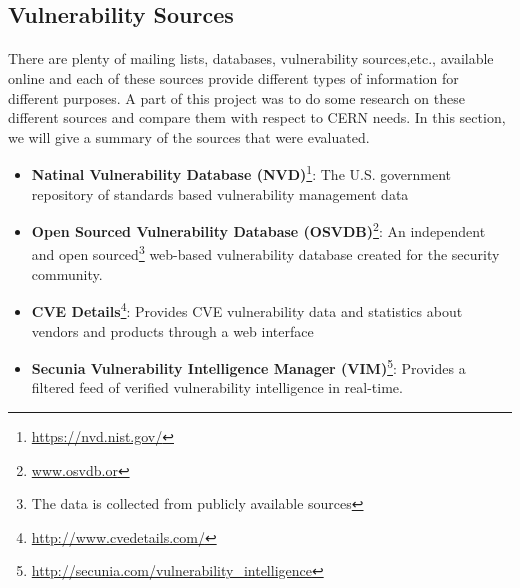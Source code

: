 \subsection{Vulnerability Sources}

\paragraph{}
There are plenty of mailing lists, databases, vulnerability sources,etc., available online and each of these sources provide different types of information for different purposes. A part of this project was to do some research on these different sources and compare them with respect to CERN needs. In this section, we will give a summary of the sources that were evaluated. 
\begin{itemize}
\item \textbf{Natinal Vulnerability Database (NVD)}\footnote{\url{https://nvd.nist.gov/}}: The U.S. government repository of standards based vulnerability management data
\item \textbf{Open Sourced Vulnerability Database (OSVDB)}\footnote{\url{www.osvdb.or}}: An independent and open sourced\footnote{The data is collected from publicly available sources} web-based vulnerability database created for the security community. 
\item \textbf{CVE Details}\footnote{\url{http://www.cvedetails.com/}}: Provides CVE vulnerability data and statistics about vendors and products through a web interface
\item \textbf{Secunia Vulnerability Intelligence Manager (VIM)}\footnote{\url{http://secunia.com/vulnerability_intelligence}}: Provides a filtered feed of verified vulnerability intelligence in real-time.

\end{itemize}

